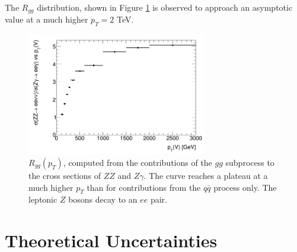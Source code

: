\documentclass[11pt,a4paper,openright,twoside]{report}
\begin{document}
The $R_{gg}$ distribution, shown in Figure \ref{fig:R_ggonly} is observed to approach an asymptotic value at a much higher $p_T = 2$ TeV.

\begin{figure}[h]
\centering
\includegraphics[width=0.7\textwidth]{Rgg.png}
\caption{$R_{gg}(p_T)$, computed from the contributions of the $gg$ subprocess to the cross sections of $ZZ$ and $Z\gamma$. The curve reaches a plateau at a much higher $p_T$ than for contributions from the $q\bar{q}$ process only. The leptonic $Z$ bosons decay to an $ee$ pair.}
\label{fig:R_ggonly}
\end{figure}
\vfill

\section{Theoretical Uncertainties}
\end{document}
